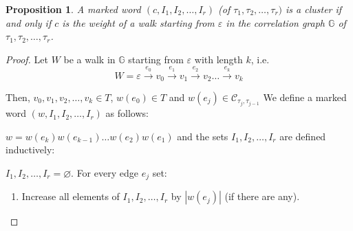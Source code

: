 \documentclass[12pt]{report}
\newtheorem{prop}{Proposition}
\begin{document}
{{\begin{comment}
\item Equivalently, given the adjacency matrix $\mathbb{A}=[a_{ij}]$ of the correlation graph $\mathbb{G}$ of $T$, the {\em generating matrix} of $\mathbb{A}$ is defined as $\overline{\mathbb{A}}=[\underline{a_{ij}}]$ where $\underline{a_{ij}}$ is the basic generating function of the set of words $a_{ij}$.

\item In order to count the marked occurrences of $T$, an $r \times r$ diagonal matrix is defined as: 
\[\Delta (T)=\begin{bmatrix}
    y_1 & 0 & 0 & \dots & 0 \\
    0 & y_2 & 0 & \dots  & 0 \\
    0 & 0 & y_3 & \dots  & 0 \\
    \vdots & \vdots & \vdots & \ddots & \vdots \\
    0 & 0 & 0 & \dots & y_r
\end{bmatrix} \]
where each $y_i \in R, \forall i\in [r]$ is an indeterminate which counts the marked occurrences of the pattern $\tau_i$ and $(R,+,\cdot)$ is a commutative ring.
\end{enumerate}
\end{comment}

\begin{prop} A marked word $(c,I_1,I_2,\ldots,I_r)$ (of $\tau_1, \tau_2, \ldots, \tau_r)$ is a cluster if and only if $c$ is the weight of a walk starting from $\varepsilon$ in the correlation graph $\mathbb{G}$ of $\tau_1, \tau_2, \ldots, \tau_r$.

\end{prop}
\begin{proof}
Let $W$ be a walk in $\mathbb{G}$ starting from $\varepsilon$ with length $k$, i.e. \[W = \varepsilon \xrightarrow{e_0} v_0 \xrightarrow{e_1} v_1 \xrightarrow{e_2} v_2 \ldots \xrightarrow{e_k} v_k\]

Then, $v_0,v_1,v_2,\ldots,v_k \in T$, $w(e_0) \in T$ and $w(e_j) \in \mathcal{C}_{\tau_{j},\tau_{j-1}}$
We define a marked word $(w,I_1,I_2,\ldots,I_r)$ as follows:

$w=w(e_k)w(e_{k-1})\ldots w(e_2)w(e_1)$ and the sets $I_1,I_2,\ldots, I_r$ are defined inductively:

$I_1,I_2,\ldots,I_r=\varnothing$. For every edge $e_j$ set:

\begin{enumerate}[label=\roman{*})]

\item Increase all elements of $I_1, I_2,\ldots,I_r$ by $|w(e_j)|$ (if there are any).


\end{enumerate}
\end{proof}}}
\end{document}
